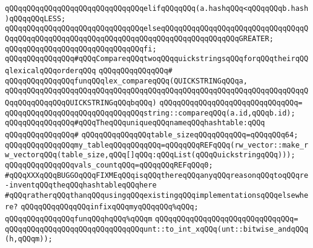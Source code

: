 \verb|qQQqqQQqqQQqqQQqqQQqqQQqqQQqqQQqelifqQQqqQQq(a.hashqQQq<qQQqqQQqb.hash)qQQqqQQqLESS;|\newline
\verb|qQQqqQQqqQQqqQQqqQQqqQQqqQQqqQQqelseqQQqqQQqqQQqqQQqqQQqqQQqqQQqqQQqqQQqqQQqqQQqqQQqqQQqqQQqqQQqqQQqqQQqqQQqqQQqqQQqqQQqqQQqGREATER;|\newline
\verb|qQQqqQQqqQQqqQQqqQQqqQQqqQQqqQQqfi;|\newline
\newline
\verb|qQQqqQQqqQQqqQQq#qQQqCompareqQQqtwoqQQqquickstringsqQQqforqQQqtheirqQQqlexicalqQQqorderqQQq|\newline
\verb|qQQqqQQqqQQqqQQq#|\newline
\verb|qQQqqQQqqQQqqQQqfunqQQqlex_compareqQQq(QUICKSTRINGqQQqa,|\newline
\verb|qQQqqQQqqQQqqQQqqQQqqQQqqQQqqQQqqQQqqQQqqQQqqQQqqQQqqQQqqQQqqQQqqQQqqQQqqQQqqQQqqQQqQUICKSTRINGqQQqbqQQq)|\newline
\verb|qQQqqQQqqQQqqQQqqQQqqQQqqQQqqQQq=|\newline
\verb|qQQqqQQqqQQqqQQqqQQqqQQqqQQqqQQqstring::compareqQQq(a.id,qQQqb.id);|\newline
\newline
\verb|qQQqqQQqqQQqqQQq#qQQqTheqQQquniqueqQQqnameqQQqhashtable:qQQq|\newline
\verb|qQQqqQQqqQQqqQQq#|\newline
\verb|qQQqqQQqqQQqqQQqtable_sizeqQQqqQQqqQQq=qQQqqQQq64;|\newline
\verb|qQQqqQQqqQQqqQQqmy_tableqQQqqQQqqQQq=qQQqqQQqREFqQQq(rw_vector::make_rw_vectorqQQq(table_size,qQQq[]qQQq:qQQqList(qQQqQuickstringqQQq)));|\newline
\verb|qQQqqQQqqQQqqQQqvals_countqQQq=qQQqqQQqREFqQQq0;|\newline
\newline
\verb|#qQQqXXXqQQqBUGGOqQQqFIXMEqQQqisqQQqthereqQQqanyqQQqreasonqQQqtoqQQqre-inventqQQqtheqQQqhashtableqQQqhere|\newline
\verb|#qQQqratherqQQqthanqQQqusingqQQqexistingqQQqimplementationsqQQqelsewhere?|\newline
\newline
\verb|qQQqqQQqqQQqqQQqinfixqQQqmyqQQqqQQq%qQQq;|\newline
\newline
\verb|qQQqqQQqqQQqqQQqfunqQQqhqQQq%qQQqm|\newline
\verb|qQQqqQQqqQQqqQQqqQQqqQQqqQQqqQQq=|\newline
\verb|qQQqqQQqqQQqqQQqqQQqqQQqqQQqqQQqunt::to_int_xqQQq(unt::bitwise_andqQQq(h,qQQqm));|\newline
